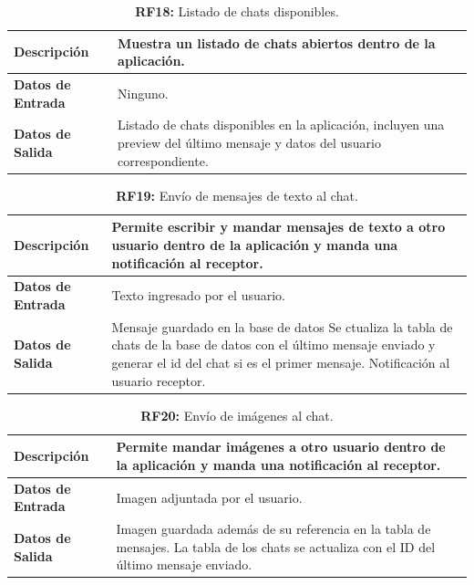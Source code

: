 \documentclass[a4paper, 12pt]{article}
\begin{document}
\begin{table}[H]
\captionsetup{list=no}%
\captionsetup{justification=raggedright,singlelinecheck=false}
\captionsetup{labelformat=empty}
\caption{\textbf{RF18:} Listado de chats disponibles.}
\label{tab:RF18}
	\begin{tabular}{|m{5cm}|m{10cm}|}
	\hline
	\textbf{Descripción} & Muestra  un listado de chats abiertos dentro de la aplicación. \\ 
	\hline
	\textbf{Datos de Entrada} & Ninguno. \\ 
	\hline
	\textbf{Datos de Salida} & Listado de chats disponibles en la aplicación, incluyen una preview del último mensaje y datos del usuario correspondiente. \\ 
	\hline
\end{tabular}
\end{table}


\begin{table}[H]
\captionsetup{list=no}%
\captionsetup{justification=raggedright,singlelinecheck=false}
\captionsetup{labelformat=empty}
\caption{\textbf{RF19:} Envío de mensajes de texto al chat.}
\label{tab:RF19}
	\begin{tabular}{|m{5cm}|m{10cm}|}
	\hline
	\textbf{Descripción} & Permite escribir y mandar mensajes de texto a otro usuario dentro de la aplicación y manda una notificación al receptor. \\ 
	\hline
	\textbf{Datos de Entrada} & Texto ingresado por el usuario. \\ 
	\hline
	\textbf{Datos de Salida} & Mensaje guardado en la base de datos Se ctualiza la tabla de chats de la base de datos con el último mensaje enviado y generar el id del chat si es el primer mensaje. Notificación al usuario receptor. \\ 
	\hline
\end{tabular}
\end{table}


\begin{table}[H]
\captionsetup{list=no}%
\captionsetup{justification=raggedright,singlelinecheck=false}
\captionsetup{labelformat=empty}
\caption{\textbf{RF20:} Envío de imágenes al chat.}
\label{tab:RF20}
	\begin{tabular}{|m{5cm}|m{10cm}|}
\hline
	\textbf{Descripción} & Permite mandar imágenes a otro usuario dentro de la aplicación y manda una notificación al receptor. \\ 
	\hline
	\textbf{Datos de Entrada} & Imagen adjuntada por el usuario. \\ 
	\hline
	\textbf{Datos de Salida} & Imagen guardada además de su referencia en la tabla de mensajes. La tabla de los chats se actualiza con el ID del último mensaje enviado. \\ 
	\hline
\end{tabular}
\end{table}
\end{document}
